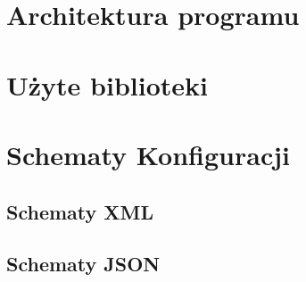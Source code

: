 \documentclass{iiuwb}
\begin{document}
\section{Architektura programu}

\section{Użyte biblioteki}

\section{Schematy Konfiguracji}

\subsection{Schematy XML}

\subsection{Schematy JSON}

\cleardoublepage


\end{document}
